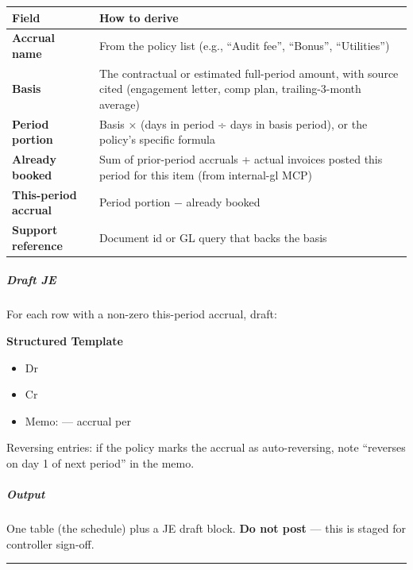 \documentclass[11pt]{article}
\begin{document}
\begingroup
\small
\setlength{\tabcolsep}{2pt}
\begin{longtable}{>{\RaggedRight\arraybackslash\hspace{0pt}}p{}>{\RaggedRight\arraybackslash\hspace{0pt}}p{}}
\toprule
{} \textbf{Field} & \textbf{How to derive} \\
\midrule
{} \textbf{Accrual name} & From the policy list (e.g., ``Audit fee'', ``Bonus'', ``Utilities'') \\
{} \textbf{Basis} & The contractual or estimated full-period amount, with source cited (engagement letter, comp plan, trailing-3-month average) \\
{} \textbf{Period portion} & Basis × (days in period ÷ days in basis period), or the policy's specific formula \\
{} \textbf{Already booked} & Sum of prior-period accruals + actual invoices posted this period for this item (from internal-gl MCP) \\
{} \textbf{This-period accrual} & Period portion − already booked \\
{} \textbf{Support reference} & Document id or GL query that backs the basis \\
\bottomrule
\end{longtable}
\endgroup

\subparagraph{Draft JE}\mbox{}\par

For each row with a non-zero this-period accrual, draft:


\textbf{Structured Template}
\begin{itemize}[leftmargin=*,itemsep=2pt,topsep=2pt]
\item {} Dr
\item {} Cr
\item {} Memo: — accrual per
\end{itemize}

Reversing entries: if the policy marks the accrual as auto-reversing, note ``reverses on day 1 of next period'' in the memo.


\subparagraph{Output}\mbox{}\par

One table (the schedule) plus a JE draft block. \textbf{Do not post} — this is staged for controller sign-off.


\vspace{0.8em}\hrule\vspace{0.8em}
\end{document}
